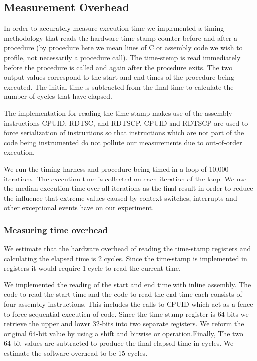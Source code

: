 \subsection{Measurement Overhead}

In order to accurately measure execution time we implemented a timing
methodology that reads the hardware time-stamp counter before and after a
procedure (by procedure here we mean lines of C or assembly code we wish to
profile, not necessarily a procedure call).  The time-stemp is read immediately
before the procedure is called and again after the procedure exits. The two
output values correspond to the start and end times of the procedure being
executed. The initial time is subtracted from the final time to calculate the
number of cycles that have elapsed.

The implementation for reading the time-stamp makes use of the assembly
instructions CPUID, RDTSC, and RDTSCP. CPUID and RDTSCP are used to force
serialization of instructions so that instructions which are not part of the
code being instrumented do not pollute our measurements due to out-of-order
execution.\cite{intel}

We run the timing harness and procedure being timed in a loop of 10,000
iterations. The execution time is collected on each iteration of the loop. We
use the median execution time over all iterations as the final result in order
to reduce the influence that extreme values caused by context switches,
interrupts and other exceptional events have on our experiment. 

\subsubsection{Measuring time overhead} 

We estimate that the hardware overhead of reading the time-stamp registers and
calculating the elapsed time is 2 cycles. Since the time-stamp is implemented in
registers it would require 1 cycle to read the current time. 

We implemented the reading of the start and end time with inline assembly. The
code to read the start time and the code to read the end time each consists of
four assembly instructions. This includes the calls to CPUID which act as a
fence to force sequential execution of code.  Since the time-stamp register is
64-bits we retrieve the upper and lower 32-bits into two separate registers. We
reform the original 64-bit value by using a shift and bitwise or
operation.Finally,  The two 64-bit values are subtracted to produce the final
elapsed time in cycles. We estimate the software overhead to be 15 cycles.

